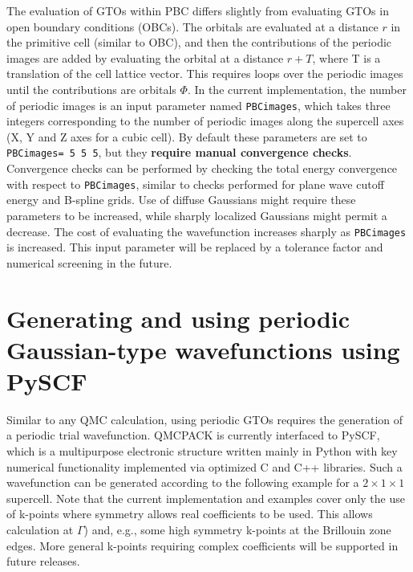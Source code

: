 The evaluation of GTOs within PBC differs slightly from evaluating
GTOs in open boundary conditions (OBCs).  The orbitals are evaluated at
a distance $r$ in the primitive cell (similar to OBC), and then the
contributions of the periodic images are added by evaluating the
orbital at a distance $r+T$, where T is a translation of the cell
lattice vector. This requires loops over the periodic images until the
contributions are orbitals $\Phi$. In the current implementation, the
number of periodic images is an input parameter named
\texttt{PBCimages}, which takes three integers corresponding to the
number of periodic images along the supercell axes (X, Y and Z axes
for a cubic cell). By default these parameters are set to
\texttt{PBCimages= 5 5 5}, but they \textbf{require manual convergence
  checks}. Convergence checks can be performed by checking the total
energy convergence with respect to \texttt{PBCimages}, similar to checks
performed for plane wave cutoff energy and B-spline grids. Use of
diffuse Gaussians might require these parameters to be increased, while
sharply localized Gaussians might permit a decrease. The cost of
evaluating the wavefunction increases sharply as \texttt{PBCimages} is
increased. This input parameter will be replaced by a tolerance
factor and numerical screening in the future.

\section{Generating and using periodic Gaussian-type wavefunctions
  using PySCF}

Similar to any QMC calculation, using periodic GTOs requires the
generation of a periodic trial wavefunction. QMCPACK is currently
interfaced to PySCF, which is a multipurpose electronic structure
written mainly in Python with key numerical functionality implemented
via optimized C and C++ libraries\cite{Sun2018}. Such a wavefunction
can be generated according to the following example for a $2 \times 1 \times 1$ supercell. Note that the current implementation and examples cover only
the use of k-points where symmetry allows real coefficients to be
used.  This allows calculation at $\Gamma$) and, e.g., some high
symmetry k-points at the Brillouin zone edges.  More general k-points
requiring complex coefficients will be supported in future releases.

